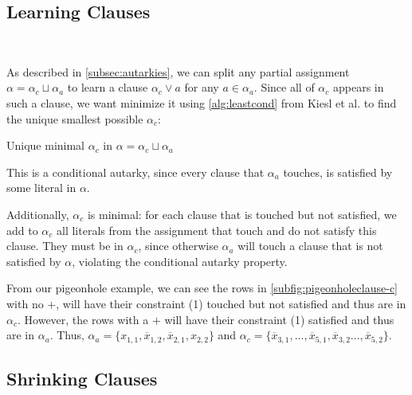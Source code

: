 \subsection{Learning Clauses}~\label{subsec:learning}


As described in \autoref{subsec:autarkies}, we can split any partial assignment
$\alpha = \alpha_c \sqcup \alpha_a$ to learn a \pr clause $\alpha_c \lor a$ for
any $a \in \alpha_a$. Since all of $\alpha_c$ appears in such a clause, we want
minimize it using \autoref{alg:leastcond} from Kiesl et al.
\cite{conditionalautarkies} to find the unique smallest possible $\alpha_c$:


\begin{algorithm}
    \caption{Unique minimal $\alpha_c$ in $\alpha = \alpha_c \sqcup \alpha_a$}\label{alg:leastcond}
    \SetAlgoNoLine

\end{algorithm}

This is a conditional autarky, since every clause that $\alpha_a$ touches, is
satisfied by some literal in $\alpha$.

Additionally, $\alpha_c$ is minimal: for each clause that is touched but not
satisfied, we add to $\alpha_c$ all literals from the assignment that touch and do
not satisfy this clause. They must be in $\alpha_c$, since otherwise $\alpha_a$
will touch a clause that is not satisfied by $\alpha$, violating the conditional
autarky property.

From our pigeonhole example, we can see the rows in
\autoref{subfig:pigeonholeclause-c} with no $+$, will have their constraint (1)
touched but not satisfied and thus are in $\alpha_c$. However, the rows with a
$+$ will have their constraint (1) satisfied and thus are in $\alpha_a$. Thus,
$\alpha_a = \{x_{1, 1}, \overline{x}_{1, 2}, \overline{x}_{2, 1}, x_{2, 2}\}$
and $\alpha_c = \{\overline{x}_{3, 1}, \ldots, \overline{x}_{5, 1}, \overline{x}_{3,
2} \ldots, \overline{x}_{5, 2}\}$.

\subsection{Shrinking Clauses}~\label{subsec:shrinking}

